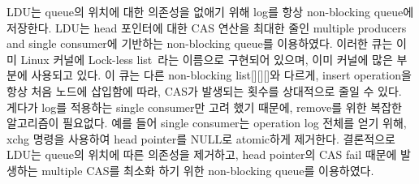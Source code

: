 





\fi

\ifkor
LDU는 queue의 위치에 대한 의존성을 없애기 위해 log를 항상 non-blocking queue에
저장한다.
LDU는 head 포인터에 대한 CAS 연산을 최대한 줄인 multiple producers and single
consumer에 기반하는 non-blocking queue를 이용하였다.
이러한 큐는 이미 Linux 커널에 Lock-less list~\cite{HuangLocklessList}라는 이름으로 구현되어 있으며, 이미
커널에 많은 부분에 사용되고 있다.
이 큐는 다른 non-blocking list[][][]와 다르게, insert operation을 항상 처음 노드에 삽입함에
따라, CAS가 발생되는 횟수를 상대적으로 줄일 수 있다.
게다가 log를 적용하는 single consumer만 고려 했기 때문에, remove를 위한 복잡한 알고리즘이 필요없다. 
예를 들어 single consumer는 operation log 전체를 얻기 위해, xchg 명령을 사용하여 head pointer를
NULL로 atomic하게 제거한다. 
결론적으로 LDU는 queue의 위치에 따른 의존성을 제거하고, head pointer의 CAS fail 때문에 발생하는 multiple
CAS를 최소화 하기 위한 non-blocking queue를 이용하였다.
\else








